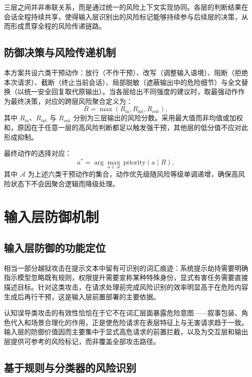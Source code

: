 三层之间并非串联关系，而是通过统一的风险上下文实现协同。各层的判断结果在会话全程持续共享，使得输入层识别出的风险标记能够持续参与后续层的决策，从而形成贯穿全程的风险传递链路。

\subsection{防御决策与风险传递机制}

本方案共设六类干预动作：放行（不作干预）、改写（调整输入语境）、阻断（拒绝本次请求）、截断（终止当前会话）、局部脱敏（遮蔽输出中的危险细节）与全文替换（以统一安全回复取代原输出）。当各层给出不同强度的建议时，取最强动作作为最终决策，对应的跨层风险聚合定义为：
\begin{equation}
R=\max \left(R_{\mathrm{in}}, R_{\mathrm{int}}, R_{\mathrm{out}}\right),
\end{equation}
其中 $R_{\mathrm{in}}$、$R_{\mathrm{int}}$ 与 $R_{\mathrm{out}}$ 分别为三层输出的风险分数。采用最大值而非均值或加权和，原因在于任意一层的高风险判断都足以触发强干预，其他层的低分值不应对此形成抑制。

最终动作的选择对应：
\begin{equation}
a^{*}=\arg\max_{a \in \mathcal{A}} \, \mathrm{priority}(a \mid R),
\end{equation}
其中 $\mathcal{A}$ 为上述六类干预动作的集合，动作优先级随风险等级单调递增，确保高风险状态下不会因聚合逻辑而降级处理。

\section{输入层防御机制}

\subsection{输入层防御的功能定位}

相当一部分越狱攻击在提示文本中留有可识别的词汇痕迹：系统提示劫持需要明确指示模型忽略既有规则，权限提升需要宣称某种特殊身份，显式有害任务需要直接描述目标。针对这类攻击，在请求处理前完成风险识别的效率明显高于在危险内容生成后再行干预，这是输入层前置部署的主要依据。

认知误导类攻击的有效性恰恰在于它不在词汇层面暴露危险意图——叙事包装、角色代入和场景合理化的作用，正是使危险请求在表层特征上与无害请求趋于一致。输入层的防御价值因而主要集中于显式高危请求的前置拦截，以及为交互层和输出层提供可参考的风险标记，而非覆盖全部攻击路径。

\subsection{基于规则与分类器的风险识别}

